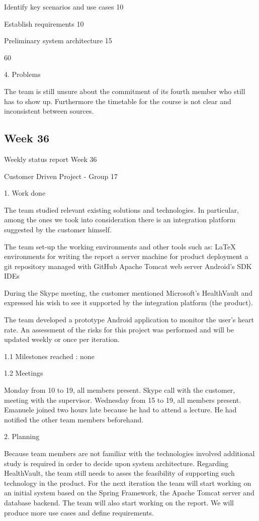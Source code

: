 Identify key scenarios and use cases
10

Establish requirements
10

Preliminary system architecture
15

60

4. Problems

The team is still unsure about the commitment of its fourth member
who still has to show up. Furthermore the timetable for the course
is not clear and inconsistent between sources.

\subsection{Week 36}
Weekly status report
Week 36

Customer Driven Project - Group 17

1. Work done

The team studied relevant existing solutions and technologies.
In particular, among the ones we took into consideration there is an
integration platform suggested by the customer himself.

The team set-up the working environments and other tools such as:
LaTeX environments for writing the report
a server machine for product deployment
a git repository managed with GitHub
Apache Tomcat web server
Android’s SDK
IDEs

During the Skype meeting, the customer mentioned Microsoft’s  HealthVault and expressed his wish to see it supported by the integration platform (the product).

The team developed a prototype Android application to monitor the user’s heart rate. An assessment of the risks for this project was performed and will be updated weekly or once per iteration.

1.1 Milestones reached : none

1.2 Meetings

Monday
from 10 to 19, all members present.
Skype call with the customer, meeting with the supervisor.
Wednesday
from 15 to 19, all members present. Emanuele joined two hours late because he had to attend a lecture. He had notified the other team members beforehand.

2. Planning

Because team members are not familiar with the technologies involved  additional study is required in order to decide upon system architecture.
Regarding HealthVault, the team still needs to asses the feasibility of supporting such technology in the product. For the next iteration the team will start working on an initial system based on the Spring Framework, the Apache Tomcat server and database backend. The team will also start working on the report. We will produce more use cases and define requirements.

